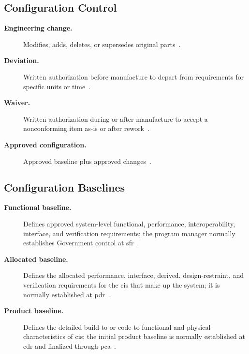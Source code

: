 \documentclass[../main.tex]{subfiles}
\begin{document}
\subsection{Configuration Control}
\begin{description}
  \item[\textbf{Engineering change.}] Modifies, adds, deletes, or supersedes original parts~\autocite{edo-3-5-3-cm-tech-reviews-2025}.
  \item[\textbf{Deviation.}] Written authorization before manufacture to depart from requirements for specific units or time~\autocite{edo-3-5-3-cm-tech-reviews-2025}.
  \item[\textbf{Waiver.}] Written authorization during or after manufacture to accept a nonconforming item as-is or after rework~\autocite{edo-3-5-3-cm-tech-reviews-2025}.
  \item[\textbf{Approved configuration.}] Approved baseline plus approved changes~\autocite{edo-3-5-3-cm-tech-reviews-2025}.
\end{description}

\subsection{Configuration Baselines}
\begin{description}
  \item[\textbf{Functional baseline.}] Defines approved system-level functional, performance, interoperability, interface, and verification requirements; the program manager normally establishes Government control at \ac{sfr}~\autocite{edo-3-5-3-cm-tech-reviews-2025,DAU-Functional-Baseline}.
  \item[\textbf{Allocated baseline.}] Defines the allocated performance, interface, derived, design-restraint, and verification requirements for the \acp{ci} that make up the system; it is normally established at \ac{pdr}~\autocite{edo-3-5-3-cm-tech-reviews-2025,DAU-Allocated-Baseline}.
  \item[\textbf{Product baseline.}] Defines the detailed build-to or code-to functional and physical characteristics of \acp{ci}; the initial product baseline is normally established at \ac{cdr} and finalized through \ac{pca}~\autocite{edo-3-5-3-cm-tech-reviews-2025,DAU-Product-Baseline,DAU-Critical-Design-Review}.
\end{description}
\end{document}
